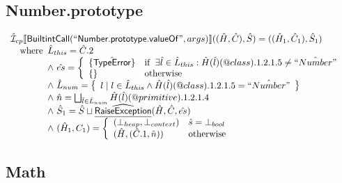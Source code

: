 \documentclass{article}
\makeatletter
\newcommand{\SF}[1]{\mbox{\textsf{#1}}}
\newcommand{\wherec}[1]{{\rm where}\begin{array}[t]{l}#1\end{array}}
\newcommand{\ifc}[1]{{\rm if}\begin{array}[t]{l}#1\end{array}}
\newcommand{\owc}{{\rm otherwise}}
\newcommand{\aI}{\hat{\mathcal{I}}}
\newcommand{\set}[1]{\left\{\begin{array}{l}#1\end{array}\right\}}
\newcommand{\lbr}{\llbracket}
\newcommand{\rbr}{\rrbracket}
\newcommand{\ahf}[1]{\widehat{\underline{\sf #1}}}
\newcommand{\varprop}[1]{@#1}
\makeatother
\begin{document}
\subsection{Number.prototype}
\[
\begin{array}{l}
\aI _{cp}\lbr \SF{BuiltintCall}(``\SF{Number.prototype.valueOf}",args)\rbr((\hat{H},\hat{C}), \hat{S})
  = ((\hat{H}_1, \hat{C}_1), \hat{S}_1)\\
\quad\wherec{
  \hat{L}_{this} = \hat{C}.2\\
  \land\ \hat{es} = \left\{\begin{array}{ll}
      \{\hat{\SF{TypeError}}\} 
      & \ifc{\exists \hat{l} \in \hat{L}_{this}:
          \hat{H}(\hat{l})(\varprop{class}).1.2.1.5 \neq \hat{``Number"}}\\
      \set{} & \owc
    \end{array}\right.\\
  \land\ \hat{L}_{num} = 
    \set{ l \mid l \in \hat{L}_{this} \land  \hat{H}(\hat{l})(\varprop{class}).1.2.1.5 = \hat{``Number"}}\\
  \land\ \hat{n} = \bigsqcup_{\hat{l} \in \hat{L}_{num}} \hat{H}(\hat{l})(\varprop{primitive}).1.2.1.4\\
  \land\ \hat{S}_1 = \hat{S} \sqcup \ahf{RaiseException}(\hat{H}, \hat{C}, \hat{es})\\
  \land\ (\hat{H}_1, {C}_1) = \left\{\begin{array}{ll}
      (\bot_{heap}, \bot_{context}) & \hat{s} = \bot_{bool}\\
      (\hat{H}, (\hat{C}.1, \hat{n})) & \owc\\
    \end{array}\right.
  }\\
\end{array}
\]


\subsection{Math}
\end{document}
